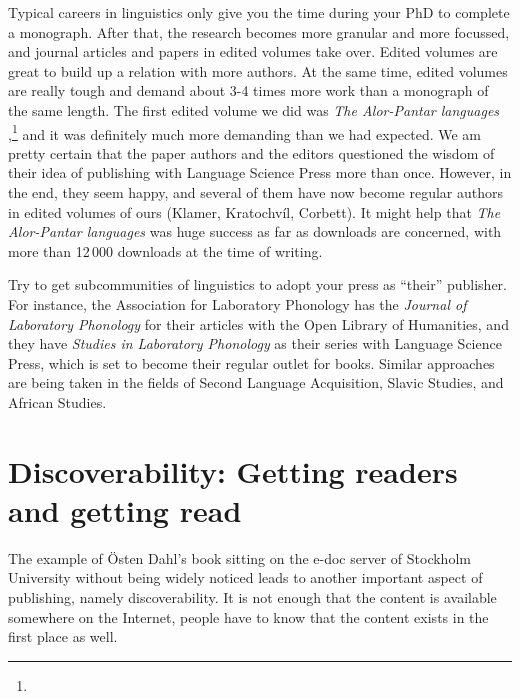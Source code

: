 \documentclass[nonflat,modfonts,output=book] {langsci/langscibook}
\begin{document}
Typical careers in linguistics only give you the time during your PhD to complete a monograph. After that, the research becomes more granular and more focussed, and journal articles and papers in edited volumes take over. Edited volumes are great to build up a relation with more authors. At the same time, edited volumes are really tough and demand about 3-4 times more work than a monograph of the same length. The first edited volume we did was \textit{The Alor-Pantar languages} \citep{Klamer2014},\footnote{} and it was definitely much more demanding than we had expected. We am pretty certain that the paper authors and the editors questioned the wisdom of their idea of publishing with Language Science Press more than once. However, in the end, they seem happy, and several of them have now become regular authors in edited volumes of ours (Klamer, Kratochvíl, Corbett). It might help that \textit{The Alor-Pantar languages} was  huge success as far as downloads are concerned, with more than 12\,000 downloads at the time of writing. 

Try to get subcommunities of linguistics to adopt your press as ``their'' publisher. For instance, the {Association for Laboratory Phonology} has the \textit{Journal of Laboratory Phonology} for their articles with the Open Library of Humanities, and they have \textit{Studies in Laboratory Phonology} as their series with Language Science Press, which is set to become their regular outlet for books. Similar approaches are being taken in the fields of Second Language Acquisition, Slavic Studies, and African Studies. 

\section{Discoverability: Getting readers and getting read}\label{sec:discoverability} 
The example of Östen Dahl's book sitting on the e-doc server of Stockholm University without being widely noticed leads to another important aspect of publishing, namely discoverability. It is not enough that the content is available somewhere on the Internet, people have to know that the content exists in the first place as well. 
\end{document}

